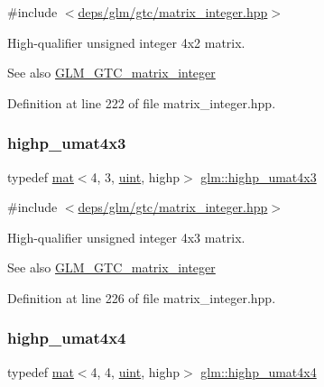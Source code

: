 {\ttfamily \#include $<$\hyperlink{matrix__integer_8hpp}{deps/glm/gtc/matrix\+\_\+integer.\+hpp}$>$}

High-\/qualifier unsigned integer 4x2 matrix. \begin{DoxySeeAlso}{See also}
\hyperlink{group__gtc__matrix__integer}{G\+L\+M\+\_\+\+G\+T\+C\+\_\+matrix\+\_\+integer} 
\end{DoxySeeAlso}


Definition at line 222 of file matrix\+\_\+integer.\+hpp.

\mbox{\label{group__gtc__matrix__integer_gaf89b61119da7856a0867a43d6c25913a}} 
\subsubsection{\texorpdfstring{highp\+\_\+umat4x3}{highp\_umat4x3}}
{\footnotesize\ttfamily typedef \hyperlink{structglm_1_1mat}{mat}$<$4, 3, \hyperlink{group__core__precision_ga4fd29415871152bfb5abd588334147c8}{uint}, highp$>$ \hyperlink{group__gtc__matrix__integer_gaf89b61119da7856a0867a43d6c25913a}{glm\+::highp\+\_\+umat4x3}}



{\ttfamily \#include $<$\hyperlink{matrix__integer_8hpp}{deps/glm/gtc/matrix\+\_\+integer.\+hpp}$>$}

High-\/qualifier unsigned integer 4x3 matrix. \begin{DoxySeeAlso}{See also}
\hyperlink{group__gtc__matrix__integer}{G\+L\+M\+\_\+\+G\+T\+C\+\_\+matrix\+\_\+integer} 
\end{DoxySeeAlso}


Definition at line 226 of file matrix\+\_\+integer.\+hpp.

\mbox{\label{group__gtc__matrix__integer_gada50011594ccf358c9eafe49ff07999f}} 
\subsubsection{\texorpdfstring{highp\+\_\+umat4x4}{highp\_umat4x4}}
{\footnotesize\ttfamily typedef \hyperlink{structglm_1_1mat}{mat}$<$4, 4, \hyperlink{group__core__precision_ga4fd29415871152bfb5abd588334147c8}{uint}, highp$>$ \hyperlink{group__gtc__matrix__integer_gada50011594ccf358c9eafe49ff07999f}{glm\+::highp\+\_\+umat4x4}}



